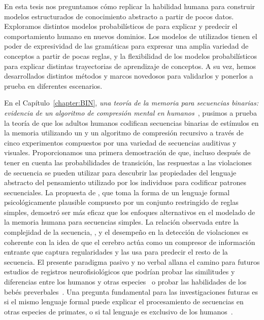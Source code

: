 
En esta tesis nos preguntamos cómo replicar la habilidad humana para construir modelos estructurados de conocimiento abstracto a partir de pocos datos. Exploramos distintos modelos probabilísticos de \lot para explicar y predecir el comportamiento humano en nuevos dominios. Los modelos de \lot utilizados tienen el poder de expresividad de las gramáticas para expresar una amplia variedad de conceptos a partir de pocas reglas, y la flexibilidad de los modelos probabilísticos para explicar distintas trayectorias de aprendizaje de conceptos. A su vez, hemos desarrollados distintos métodos y marcos novedosos para validarlos y ponerlos a prueba en diferentes escenarios.

En el Capítulo~\ref{chapter:BIN}, \textit{una teoría de la memoria para secuencias binarias: evidencia de un algoritmo de compresión mental en humanos~\cite{planton2021memory}}, pusimos a prueba la teoría de que los adultos humanos codifican secuencias binarias de estímulos en la memoria utilizando un \lot y un algoritmo de compresión recursivo a través de cinco experimentos compuestos por una variedad de secuencias auditivas y visuales. Proporcionamos una primera demostración de que, incluso después de tener en cuenta las probabilidades de transición, las respuestas a las violaciones de secuencia se pueden utilizar para descubrir las propiedades del lenguaje abstracto del pensamiento utilizado por los individuos para codificar patrones secuenciales. La propuesta de \grambin, que toma la forma de un lenguaje formal psicológicamente plausible compuesto por un conjunto restringido de reglas simples, demostró ser más eficaz que los enfoques alternativos en el modelado de la memoria humana para secuencias simples. La relación observada entre la complejidad de la secuencia, \mdlbin, y el desempeño en la detección de violaciones es coherente con la idea de que el cerebro actúa como un compresor de información entrante que captura regularidades y las usa para predecir el resto de la secuencia. El presente paradigma pasivo y no verbal allana el camino para futuros estudios de registros neurofisiológicos que podrían probar las similitudes y diferencias entre los humanos y otras especies~\cite{f13} o probar las habilidades de los bebés preverbales~\cite{f70}. Una pregunta fundamental para las investigaciones futuras es si el mismo lenguaje formal puede explicar el procesamiento de secuencias en otras especies de primates, o si tal lenguaje es exclusivo de los humanos~\cite{f6}.

